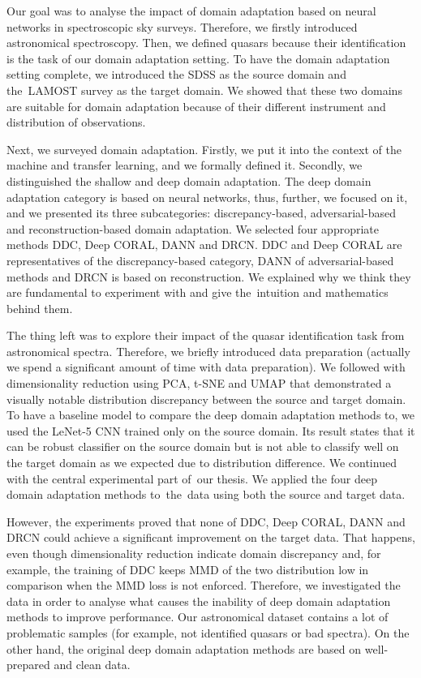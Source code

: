 \documentclass[thesis=M,english]{FITthesis}[2012/10/20]
\begin{document}
Our goal was to analyse the impact of domain adaptation based on neural networks in spectroscopic sky surveys.
Therefore, we firstly introduced astronomical spectroscopy.
Then, we defined quasars because their identification is the task of our domain adaptation setting.
To have the domain adaptation setting complete,
we introduced the SDSS as the source domain and the~LAMOST survey as the target domain.
We showed that these two domains are suitable for domain adaptation
because of their different instrument and distribution of observations.

Next, we surveyed domain adaptation.
Firstly, we put it into the context of the machine and transfer learning,
and we formally defined it.
Secondly, we distinguished the shallow and deep domain adaptation.
The deep domain adaptation category is based on neural networks,
thus, further, we focused on it, and we presented its three subcategories:
discrepancy-based, adversarial-based and reconstruction-based domain adaptation.
We selected four appropriate methods DDC, Deep CORAL, DANN and DRCN.
DDC and Deep CORAL are representatives of the discrepancy-based category, DANN of adversarial-based methods and DRCN is based on reconstruction.
We explained why we think they are fundamental to experiment with
and give the~intuition and mathematics behind them.

The thing left was to explore their impact of the quasar identification task from astronomical spectra.
Therefore, we briefly introduced data preparation
(actually we spend a significant amount of time with data preparation).
We followed with dimensionality reduction using PCA, t-SNE and UMAP
that demonstrated a visually notable distribution discrepancy between the source and target domain.
To have a baseline model to compare the deep domain adaptation methods to,
we used the LeNet-5 CNN trained only on the source domain.
Its result states that it can be robust classifier on the source domain
but is not able to classify well on the target domain as we expected due to distribution difference.
We continued with the central experimental part of~our thesis.
We applied the four deep domain adaptation methods to~the~data using both the source and target data.

However, the experiments proved that none of DDC, Deep CORAL, DANN and DRCN could achieve a significant improvement on the target data.
That happens, even though dimensionality reduction indicate domain discrepancy
and, for example, the training of DDC keeps MMD of the two distribution low in comparison when the MMD loss is not enforced.
Therefore, we investigated the data in order to analyse
what causes the inability of deep domain adaptation methods to improve performance.
Our astronomical dataset contains a lot of problematic samples
(for example, not identified quasars or bad spectra).
On the other hand, the original deep domain adaptation methods are based on well-prepared and clean data.
\end{document}
